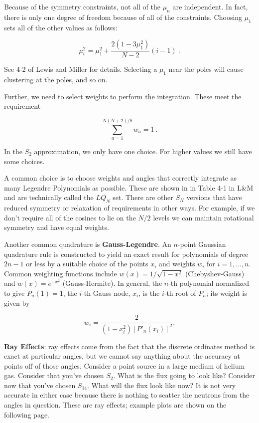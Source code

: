 \documentclass[12pt]{article}
\begin{document}
Because of the symmetry constraints, not all of the $\mu_n$ are independent. In 
fact, there is only one degree of freedom because of all of the constraints. 
Choosing $\mu_1$ sets all of the other values as follows:

\[
\mu_i^2 = \mu_1^2 + \frac{2(1 - 3\mu_1^2)}{N-2}(i-1)\:.
\]

See 4-2 of Lewis and Miller for details. Selecting a $\mu_1$ near the poles 
will cause clustering at the poles, and so on. 

Further, we need to select weights to perform the integration. These meet the 
requirement

\[
\sum_{a=1}^{N(N+2)/8} w_a = 1\:.
\]

In the $S_2$ approximation, we only have one choice. For higher values we 
still have some choices. 

A common choice is to choose weights and angles that correctly integrate as 
many Legendre Polynomials as possible. These are shown in in Table 4-1 in L\&M 
and are technically called the $LQ_N$ set. There are other $S_N$ versions that 
have reduced symmetry or relaxation of requirements in other ways. For 
example, if we don't require all of the cosines to lie on the $N/2$ levels we 
can maintain rotational symmetry and have equal weights. 

Another common quadrature is \textbf{Gauss-Legendre}. An $n$-point Gaussian 
quadrature rule is constructed to yield an exact result for polynomials of 
degree $2n - 1$ or less by a suitable choice of the points $x_i$ and weights
$w_i$ for $i = 1, \dots, n$. Common weighting functions include
$w(x)= 1/\sqrt{1-x^2}$ (Chebyshev-Gauss) and $w(x)=e^{-x^{2}}$ (Gauss-Hermite).
In general, the $n$-th polynomial normalized to give $P_n(1) = 1$, the $i$-th 
Gauss node, $x_i$, is the $i$-th root of $P_n$; its weight is given by

\[ 
w_{i}={\frac {2}{\left(1-x_{i}^{2}\right)[P'_{n}(x_{i})]^{2}}}.
\]
    
\textbf{Ray Effects}: ray effects come from the fact that the discrete 
ordinates method is exact at particular angles, but we cannot say anything 
about the accuracy at points off of those angles. Consider a point source in a 
large medium of helium gas. Consider that you've chosen $S_2$. What is the 
flux going to look like? Consider now that you've chosen $S_{14}$. What will the 
flux look like now? It is not very accurate in either case because there is 
nothing to scatter the neutrons from the angles in question. These are ray 
effects; example plots are shown on the following page. 
\end{document}
